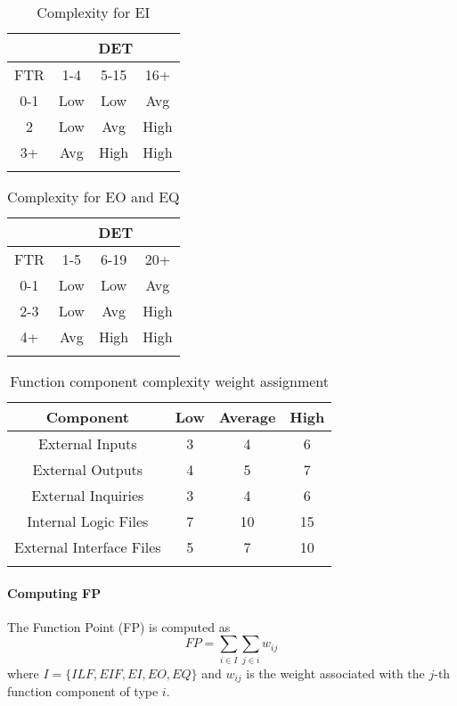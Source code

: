 \begin{longtable}{cccc}
\toprule
\multicolumn{1}{c}{} & 
\multicolumn{3}{c}{DET}\\
\midrule
FTR & 1-4 & 5-15 & 16+ \\
\midrule
0-1	&	Low	&	Low		&	Avg \\
2	&	Low	&	Avg		&	High \\
3+	&	Avg	&	High	&	High\\
\bottomrule
\caption{Complexity for EI}
\label{tbl:complexityEI}
\end{longtable}

\begin{longtable}{cccc}
\toprule
\multicolumn{1}{c}{} & 
\multicolumn{3}{c}{DET}\\
\midrule
FTR & 1-5 & 6-19 & 20+ \\
\midrule
0-1	&	Low	&	Low		&	Avg \\
2-3	&	Low	&	Avg		&	High \\
4+	&	Avg	&	High	&	High\\
\bottomrule
\caption{Complexity for EO and EQ}
\label{tbl:complexityEO_EQ}
\end{longtable}



\begin{longtable}{cccc}
\toprule
Component				&	Low	&	Average	&	High \\
\midrule
External Inputs			&	3	&	4		&	6 \\
External Outputs		&	4	&	5		&	7 \\
External Inquiries		&	3	&	4		&	6 \\
Internal Logic Files	&	7	&	10		&	15 \\
External Interface Files&	5	&	7		&	10 \\
\bottomrule
\caption{Function component complexity weight assignment}
\label{tbl:complexityWeight}
\end{longtable}

\paragraph{Computing FP}The Function Point (FP) is computed as
$$ FP = \sum_{i \in I} \sum_{j \in i} w_{ij}$$
where $ I = \{ILF,EIF,EI,EO,EQ\}$ and $w_{ij}$ is the weight associated with the $j$-th function component of type $i$.


